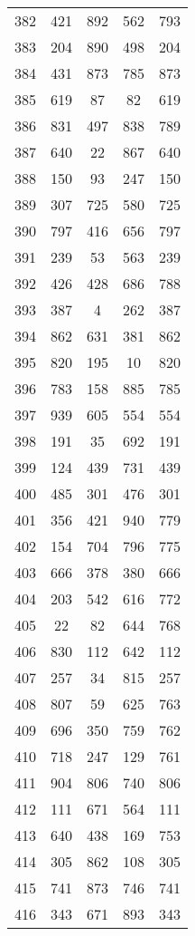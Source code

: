\documentclass[a4paper,10pt,ngerman]{scrartcl}
\begin{document}
\begin{longtable}[c]{c|c|c|c|c}
    382 & 421 & 892 & 562 & 793 \\
    383 & 204 & 890 & 498 & 204 \\
    384 & 431 & 873 & 785 & 873 \\
    385 & 619 & 87 & 82 & 619 \\
    386 & 831 & 497 & 838 & 789 \\
    387 & 640 & 22 & 867 & 640 \\
    388 & 150 & 93 & 247 & 150 \\
    389 & 307 & 725 & 580 & 725 \\
    390 & 797 & 416 & 656 & 797 \\
    391 & 239 & 53 & 563 & 239 \\
    392 & 426 & 428 & 686 & 788 \\
    393 & 387 & 4 & 262 & 387 \\
    394 & 862 & 631 & 381 & 862 \\
    395 & 820 & 195 & 10 & 820 \\
    396 & 783 & 158 & 885 & 785 \\
    397 & 939 & 605 & 554 & 554 \\
    398 & 191 & 35 & 692 & 191 \\
    399 & 124 & 439 & 731 & 439 \\
    400 & 485 & 301 & 476 & 301 \\
    401 & 356 & 421 & 940 & 779 \\
    402 & 154 & 704 & 796 & 775 \\
    403 & 666 & 378 & 380 & 666 \\
    404 & 203 & 542 & 616 & 772 \\
    405 & 22 & 82 & 644 & 768 \\
    406 & 830 & 112 & 642 & 112 \\
    407 & 257 & 34 & 815 & 257 \\
    408 & 807 & 59 & 625 & 763 \\
    409 & 696 & 350 & 759 & 762 \\
    410 & 718 & 247 & 129 & 761 \\
    411 & 904 & 806 & 740 & 806 \\
    412 & 111 & 671 & 564 & 111 \\
    413 & 640 & 438 & 169 & 753 \\
    414 & 305 & 862 & 108 & 305 \\
    415 & 741 & 873 & 746 & 741 \\
    416 & 343 & 671 & 893 & 343 \\

\end{longtable}
\end{document}
